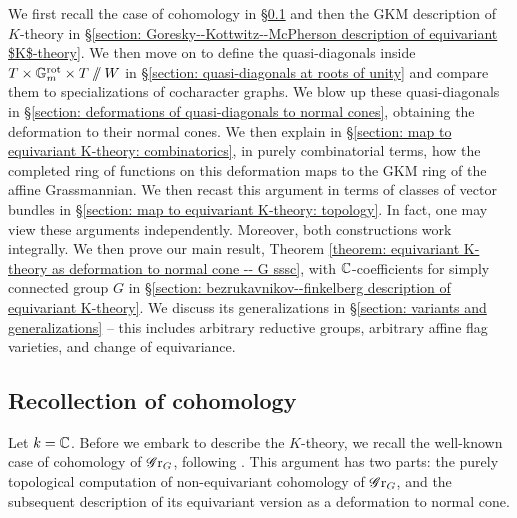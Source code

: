 We first recall the case of cohomology in \S \ref{section: recollaction of cohomology} and then the GKM description of $K$-theory in \S \ref{section: Goresky--Kottwitz--McPherson description of equivariant $K$-theory}.
We then move on to define the quasi-diagonals inside $T \times \mathbb{G}_m^{\mathrm{rot}} \times T \sslash W$ in \S \ref{section: quasi-diagonals at roots of unity} and compare them to specializations of cocharacter graphs. We blow up these quasi-diagonals in \S \ref{section: deformations of quasi-diagonals to normal cones}, obtaining the deformation to their normal cones. We then explain in \S \ref{section: map to equivariant K-theory: combinatorics}, in purely combinatorial terms, how the completed ring of functions on this deformation maps to the GKM ring of the affine Grassmannian. We then recast this argument in terms of classes of vector bundles in \S \ref{section: map to equivariant K-theory: topology}. In fact, one may view these arguments independently. Moreover, both constructions work integrally. We then prove our main result, Theorem \ref{theorem: equivariant K-theory as deformation to normal cone -- G sssc}, with $\operatorname{\mathbb{C}}$-coefficients for simply connected group $G$ in \S \ref{section: bezrukavnikov--finkelberg description of equivariant K-theory}.
%
We discuss its generalizations in \S \ref{section: variants and generalizations} -- this includes arbitrary reductive groups, arbitrary affine flag varieties, and change of equivariance.


\subsection{Recollection of cohomology}\label{section: recollaction of cohomology}
Let $k=\operatorname{\mathbb{C}}$. Before we embark to describe the $K$-theory, we recall the well-known case of cohomology of $\operatorname{\mathscr{G}r}_G$, following \cite{Gin95, BF07, Yun10}. This argument has two parts: the purely topological computation of non-equivariant cohomology of $\operatorname{\mathscr{G}r}_G$, and the subsequent description of its equivariant version as a deformation to normal cone.

